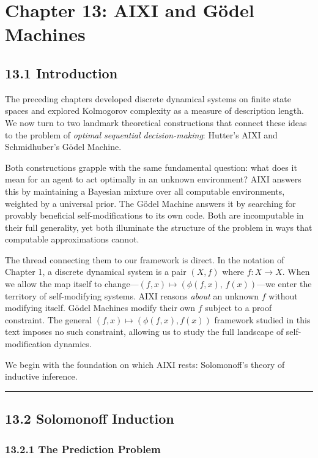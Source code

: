 \chapter{Chapter 13: AIXI and Gödel Machines}

\section{13.1 Introduction}

The preceding chapters developed discrete dynamical systems on finite state spaces and explored Kolmogorov complexity as a measure of description length. We now turn to two landmark theoretical constructions that connect these ideas to the problem of \textit{optimal sequential decision-making}: Hutter's AIXI and Schmidhuber's Gödel Machine.

Both constructions grapple with the same fundamental question: what does it mean for an agent to act optimally in an unknown environment? AIXI answers this by maintaining a Bayesian mixture over all computable environments, weighted by a universal prior. The Gödel Machine answers it by searching for provably beneficial self-modifications to its own code. Both are incomputable in their full generality, yet both illuminate the structure of the problem in ways that computable approximations cannot.

The thread connecting them to our framework is direct. In the notation of Chapter 1, a discrete dynamical system is a pair $(X, f)$ where $f: X \to X$. When we allow the map itself to change---$(f, x) \mapsto (\phi(f, x),\, f(x))$---we enter the territory of self-modifying systems. AIXI reasons \textit{about} an unknown $f$ without modifying itself. Gödel Machines modify their own $f$ subject to a proof constraint. The general $(f, x) \mapsto (\phi(f,x), f(x))$ framework studied in this text imposes no such constraint, allowing us to study the full landscape of self-modification dynamics.

We begin with the foundation on which AIXI rests: Solomonoff's theory of inductive inference.

\bigskip\hrule\bigskip

\section{13.2 Solomonoff Induction}

\subsection{13.2.1 The Prediction Problem}

